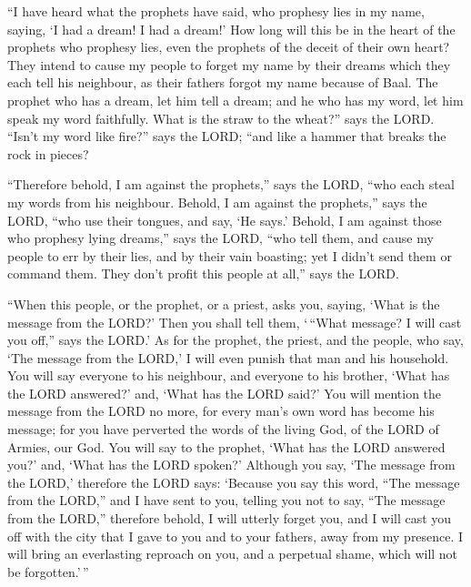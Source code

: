 ``I have heard what the prophets have said, who prophesy
lies in my name, saying, `I had a dream! I had a dream!' 
How long will this be in the heart of the prophets who prophesy lies,
even the prophets of the deceit of their own heart?  They
intend to cause my people to forget my name by their dreams which they
each tell his neighbour, as their fathers forgot my name because of
Baal.  The prophet who has a dream, let him tell a dream;
and he who has my word, let him speak my word faithfully. What is the
straw to the wheat?'' says the LORD.  ``Isn't my word
like fire?'' says the LORD; ``and like a hammer that breaks the rock in
pieces?

 ``Therefore behold, I am against the prophets,'' says
the LORD, ``who each steal my words from his neighbour. 
Behold, I am against the prophets,'' says the LORD, ``who use their
tongues, and say, `He says.'  Behold, I am against those
who prophesy lying dreams,'' says the LORD, ``who tell them, and cause
my people to err by their lies, and by their vain boasting; yet I didn't
send them or command them. They don't profit this people at all,'' says
the LORD.

 ``When this people, or the prophet, or a priest, asks
you, saying, `What is the message from the LORD?' Then you shall tell
them, `\,``What message? I will cast you off,'' says the LORD.'
 As for the prophet, the priest, and the people, who say,
`The message from the LORD,' I will even punish that man and his
household.  You will say everyone to his neighbour, and
everyone to his brother, `What has the LORD answered?' and, `What has
the LORD said?'  You will mention the message from the
LORD no more, for every man's own word has become his message; for you
have perverted the words of the living God, of the LORD of Armies, our
God.  You will say to the prophet, `What has the LORD
answered you?' and, `What has the LORD spoken?'  Although
you say, `The message from the LORD,' therefore the LORD says: `Because
you say this word, ``The message from the LORD,'' and I have sent to
you, telling you not to say, ``The message from the LORD,''
 therefore behold, I will utterly forget you, and I will
cast you off with the city that I gave to you and to your fathers, away
from my presence.  I will bring an everlasting reproach
on you, and a perpetual shame, which will not be forgotten.'\,''

